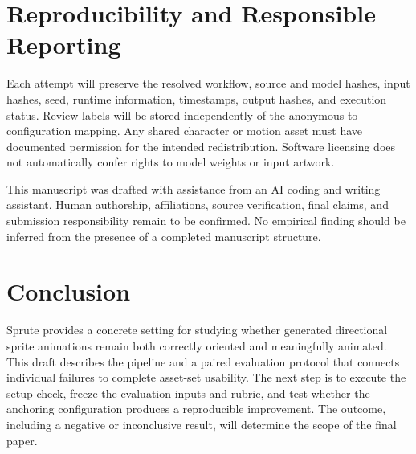 \documentclass[11pt]{article}
\begin{document}
\section{Reproducibility and Responsible Reporting}
Each attempt will preserve the resolved workflow, source and model hashes, input hashes, seed, runtime information, timestamps, output hashes, and execution status. Review labels will be stored independently of the anonymous-to-configuration mapping. Any shared character or motion asset must have documented permission for the intended redistribution. Software licensing does not automatically confer rights to model weights or input artwork.

This manuscript was drafted with assistance from an AI coding and writing assistant. Human authorship, affiliations, source verification, final claims, and submission responsibility remain to be confirmed. No empirical finding should be inferred from the presence of a completed manuscript structure.

\section{Conclusion}
Sprute provides a concrete setting for studying whether generated directional sprite animations remain both correctly oriented and meaningfully animated. This draft describes the pipeline and a paired evaluation protocol that connects individual failures to complete asset-set usability. The next step is to execute the setup check, freeze the evaluation inputs and rubric, and test whether the anchoring configuration produces a reproducible improvement. The outcome, including a negative or inconclusive result, will determine the scope of the final paper.
\end{document}
